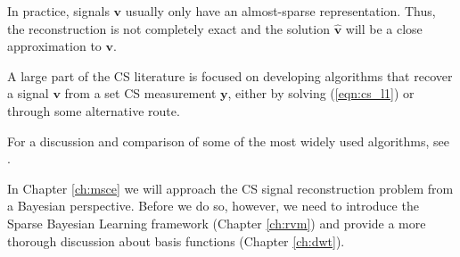 In practice, signals $\bm v$ usually only have an almost-sparse representation.
Thus, the reconstruction is not completely exact and the solution $\bm{\hat v}$ will be a close approximation to $\bm v$.

A large part of the CS literature is focused on developing algorithms that recover a signal $\bm v$ from a set CS measurement $\bm y$, either by solving (\ref{eqn:cs_l1}) or through some alternative route.

For a discussion and comparison of some of the most widely used algorithms, see \cite{pilikos2014}.

In Chapter \ref{ch:msce} we will approach the CS signal reconstruction problem from a Bayesian perspective.
Before we do so, however, we need to introduce the Sparse Bayesian Learning framework (Chapter \ref{ch:rvm}) and provide a more thorough discussion about basis functions (Chapter \ref{ch:dwt}).

